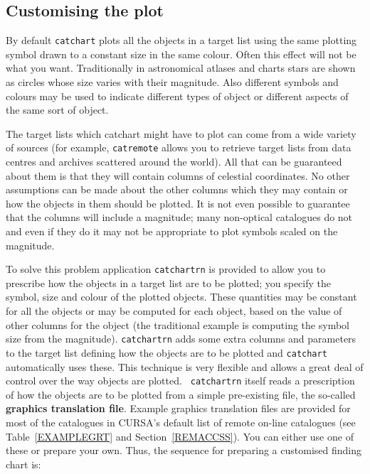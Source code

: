 \documentclass[twoside,11pt]{article}
\renewcommand{\_}{\texttt{\symbol{95}}}
\begin{document}
\subsection{\label{GRT}Customising the plot}

By default {\tt catchart} plots all the objects in a target list using
the same plotting symbol drawn to a constant size in the same colour.
Often this effect will not be what you want.  Traditionally in
astronomical atlases and charts stars are shown as circles whose
size varies with their magnitude.  Also different symbols and colours
may be used to indicate different types of object or different aspects
of the same sort of object.

The target lists which {catchart} might have to plot can come from a wide
variety of sources (for example, {\tt catremote} allows you to retrieve
target lists from data centres and archives scattered around the
world).  All that can be guaranteed about them is that they
will contain columns of celestial coordinates.  No other assumptions
can be made about the other columns which they may contain or how the
objects in them should be plotted.  It is not even possible to guarantee
that the columns will include a magnitude; many non-optical catalogues
do not and even if they do it may not be appropriate to plot symbols
scaled on the magnitude.

To solve this problem application {\tt catchartrn} is provided to allow
you to prescribe how the objects in a target list are to be plotted; you
specify the symbol, size and colour of the plotted objects.  These
quantities may be constant for all the objects or may be computed for
each object, based on the value of other columns for the object (the
traditional example is computing the symbol size from the magnitude).
{\tt catchartrn} adds some extra columns and parameters to the target list
defining how the objects are to be plotted and {\tt catchart}
automatically uses these.  This technique is very flexible and allows a
great deal of control over the way objects are plotted.  {\tt
catchartrn} itself reads a prescription of how the objects are to be
plotted from a simple pre-existing file, the so-called {\bf graphics
translation file}.  Example graphics translation files are provided for
most of the catalogues in CURSA's default list of remote on-line
catalogues (see Table~\ref{EXAMPLEGRT} and Section~\ref{REMACCSS}).
You can either use one of these or prepare your own.  Thus, the sequence
for preparing a customised finding chart is:
\end{document}
